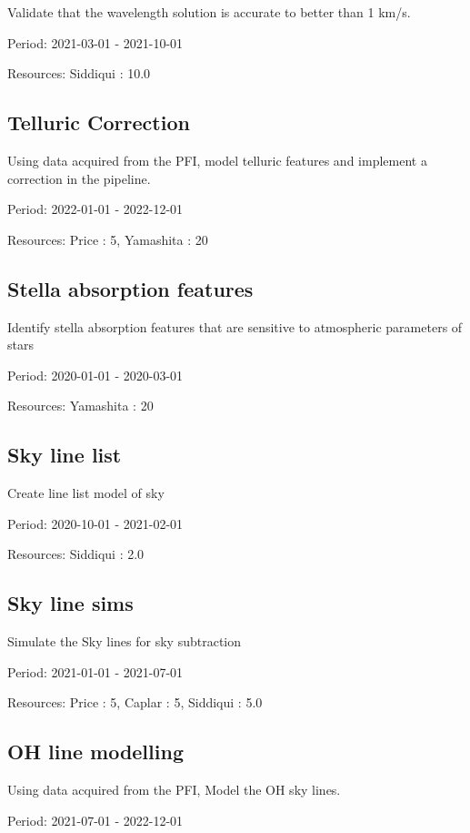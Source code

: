 Validate that the wavelength solution is accurate to better than 1 km/s.

Period: 2021-03-01 - 2021-10-01

Resources: Siddiqui : 10.0

\subsection{Telluric Correction}

Using data acquired from the PFI, model telluric features and implement a correction in the pipeline.

Period: 2022-01-01 - 2022-12-01

Resources: Price : 5, Yamashita : 20

\subsection{Stella absorption features}

Identify stella absorption features that are sensitive to atmospheric parameters of stars

Period: 2020-01-01 - 2020-03-01

Resources: Yamashita : 20

\subsection{Sky line list}

Create line list model of sky

Period: 2020-10-01 - 2021-02-01

Resources: Siddiqui : 2.0

\subsection{Sky line sims}

Simulate the Sky lines for sky subtraction

Period: 2021-01-01 - 2021-07-01

Resources: Price : 5, Caplar : 5, Siddiqui : 5.0

\subsection{OH line modelling}

Using data acquired from the PFI, Model the OH sky lines.

Period: 2021-07-01 - 2022-12-01

